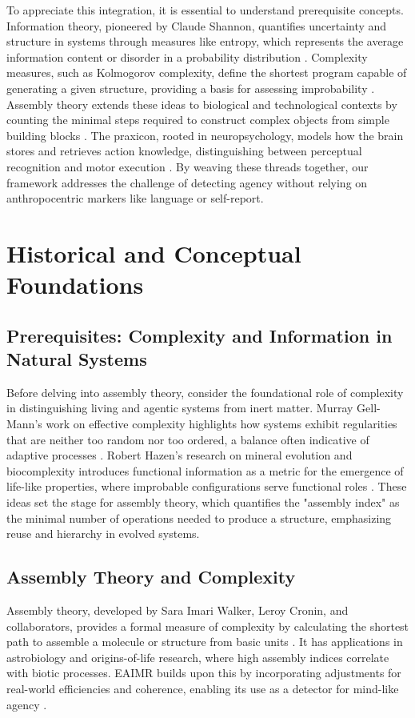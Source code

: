\documentclass{article}
\begin{document}
To appreciate this integration, it is essential to understand prerequisite concepts. Information theory, pioneered by Claude Shannon, quantifies uncertainty and structure in systems through measures like entropy, which represents the average information content or disorder in a probability distribution \citep{shannon1948}. Complexity measures, such as Kolmogorov complexity, define the shortest program capable of generating a given structure, providing a basis for assessing improbability \citep{kolmogorov1965}. Assembly theory extends these ideas to biological and technological contexts by counting the minimal steps required to construct complex objects from simple building blocks \citep{walker2013}. The praxicon, rooted in neuropsychology, models how the brain stores and retrieves action knowledge, distinguishing between perceptual recognition and motor execution \citep{peigneux2004}. By weaving these threads together, our framework addresses the challenge of detecting agency without relying on anthropocentric markers like language or self-report.

\section{Historical and Conceptual Foundations}
\label{sec:foundations}

\subsection{Prerequisites: Complexity and Information in Natural Systems}
Before delving into assembly theory, consider the foundational role of complexity in distinguishing living and agentic systems from inert matter. Murray Gell-Mann's work on effective complexity highlights how systems exhibit regularities that are neither too random nor too ordered, a balance often indicative of adaptive processes \citep{adami2012}. Robert Hazen's research on mineral evolution and biocomplexity introduces functional information as a metric for the emergence of life-like properties, where improbable configurations serve functional roles \citep{hazen2007}. These ideas set the stage for assembly theory, which quantifies the "assembly index" as the minimal number of operations needed to produce a structure, emphasizing reuse and hierarchy in evolved systems.

\subsection{Assembly Theory and Complexity}
Assembly theory, developed by Sara Imari Walker, Leroy Cronin, and collaborators, provides a formal measure of complexity by calculating the shortest path to assemble a molecule or structure from basic units \citep{cronin2016, walker2013}. It has applications in astrobiology and origins-of-life research, where high assembly indices correlate with biotic processes. EAIMR builds upon this by incorporating adjustments for real-world efficiencies and coherence, enabling its use as a detector for mind-like agency \citep{adami2012}.
\end{document}
